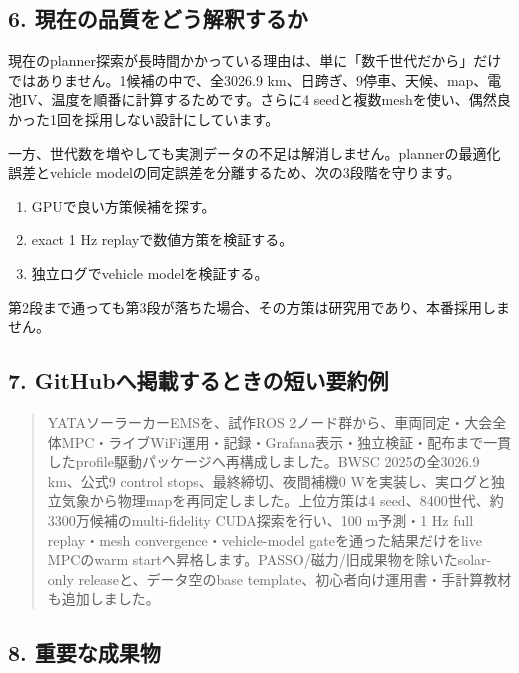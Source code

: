 \documentclass[
  japanese,
  a4paper,
  11pt]{article}
\providecommand{\tightlist}{%
  \setlength{\itemsep}{0pt}\setlength{\parskip}{0pt}}
\begin{document}
\subsection{6.
現在の品質をどう解釈するか}\label{6-ux73feux5728ux306eux54c1ux8ceaux3092ux3069ux3046ux89e3ux91c8ux3059ux308bux304b}

現在のplanner探索が長時間かかっている理由は、単に「数千世代だから」だけではありません。1候補の中で、全3026.9
km、日跨ぎ、9停車、天候、map、電池IV、温度を順番に計算するためです。さらに4
seedと複数meshを使い、偶然良かった1回を採用しない設計にしています。

一方、世代数を増やしても実測データの不足は解消しません。plannerの最適化誤差とvehicle
modelの同定誤差を分離するため、次の3段階を守ります。

\begin{enumerate}
\def\labelenumi{\arabic{enumi}.}
\tightlist
\item
  GPUで良い方策候補を探す。
\item
  exact 1 Hz replayで数値方策を検証する。
\item
  独立ログでvehicle modelを検証する。
\end{enumerate}

第2段まで通っても第3段が落ちた場合、その方策は研究用であり、本番採用しません。

\subsection{7.
GitHubへ掲載するときの短い要約例}\label{7-githubux3078ux63b2ux8f09ux3059ux308bux3068ux304dux306eux77edux3044ux8981ux7d04ux4f8b}

\begin{quote}
YATAソーラーカーEMSを、試作ROS
2ノード群から、車両同定・大会全体MPC・ライブWiFi運用・記録・Grafana表示・独立検証・配布まで一貫したprofile駆動パッケージへ再構成しました。BWSC
2025の全3026.9 km、公式9 control stops、最終締切、夜間補機0
Wを実装し、実ログと独立気象から物理mapを再同定しました。上位方策は4
seed、8400世代、約3300万候補のmulti-fidelity CUDA探索を行い、100
m予測・1 Hz full replay・mesh convergence・vehicle-model
gateを通った結果だけをlive MPCのwarm
startへ昇格します。PASSO/磁力/旧成果物を除いたsolar-only
releaseと、データ空のbase
template、初心者向け運用書・手計算教材も追加しました。
\end{quote}

\subsection{8.
重要な成果物}\label{8-ux91cdux8981ux306aux6210ux679cux7269}
\end{document}
